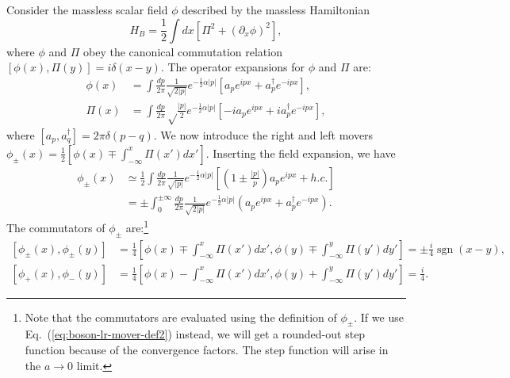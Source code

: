 \documentclass{SciPost}
\begin{document}
Consider the massless scalar field $\phi$ described by the massless Hamiltonian
\begin{equation}
	H_B = \frac{1}{2}\int dx[\Pi^2+(\partial_x\phi)^2],
\end{equation}
where $\phi$ and $\Pi$ obey the canonical commutation relation $[\phi(x),\Pi(y)] = i\delta(x-y)$.
The operator expansions for $\phi$ and $\Pi$ are:
\begin{equation}
\begin{aligned}
	\phi(x) &= \int \frac{dp}{2\pi} \frac{1}{\sqrt{2|p|}} e^{-\frac{1}{2}\alpha|p|} \left[a_p e^{ipx} + a_p^\dagger e^{-ipx} \right], \\
	\Pi(x) &= \int \frac{dp}{2\pi} \sqrt\frac{|p|}{2} e^{-\frac{1}{2}\alpha|p|} \left[-ia_p e^{ipx} + ia_p^\dagger e^{-ipx} \right],
\end{aligned}	
\end{equation}
where $[a_p,a_q^\dagger]=2\pi\delta(p-q)$.
We now introduce the right and left movers $\phi_\pm(x) = \frac{1}{2}[\phi(x)\mp\int_{-\infty}^x \Pi(x')dx']$.
Inserting the field expansion, we have
\begin{equation} \label{eq:boson-lr-mover-def2}
\begin{aligned}
	\phi_\pm(x)
	&\simeq \frac{1}{2} \int \frac{dp}{2\pi} \frac{1}{\sqrt{|p|}}e^{-\frac{1}{2}\alpha|p|}\left[\left(1\pm\frac{|p|}{p}\right)a_p e^{ipx}+h.c.\right] \\
	&= \pm\int_0^{\pm\infty} \frac{dp}{2\pi}\frac{1}{\sqrt{2|p|}}e^{-\frac{1}{2}\alpha|p|} \left(a_p e^{ipx} + a_p^\dagger e^{-ipx} \right).
\end{aligned}
\end{equation}
The commutators of $\phi_\pm$ are:\footnote{Note that the commutators are evaluated using the definition of $\phi_\pm$.
If we use Eq.~(\ref{eq:boson-lr-mover-def2}) instead, we will get a rounded-out step function because of the convergence factors.
The step function will arise in the $a\rightarrow 0$ limit.}
\begin{equation*}
\begin{aligned}
	\left[\phi_\pm(x),\phi_\pm(y)\right] 
	&= \frac{1}{4}\left[\phi(x)\mp\int_{-\infty}^x \Pi(x')dx',\phi(y)\mp\int_{-\infty}^y \Pi(y')dy'\right]
	= \pm\frac{i}{4} \operatorname{sgn}(x-y), \\
	\left[\phi_+(x),\phi_-(y)\right] 
	&= \frac{1}{4}\left[\phi(x)-\int_{-\infty}^x \Pi(x')dx',\phi(y)+\int_{-\infty}^y \Pi(y')dy'\right]
	= \frac{i}{4}.
\end{aligned}
\end{equation*}
\end{document}
